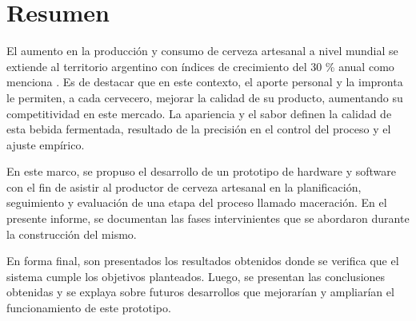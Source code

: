 \pagestyle{plain}
\afterpage{\null\newpage}\thispagestyle{plain}
\newpage
\chapter{Resumen}
\par
    El aumento en la producción y consumo de cerveza artesanal a nivel mundial se extiende al territorio argentino con índices de crecimiento del 30 \% anual como menciona \cite{Cuculiansky17}. Es de destacar que en este contexto, el aporte personal y la impronta le permiten, a cada cervecero, mejorar la calidad de su producto, aumentando su competitividad en este mercado. La apariencia y el sabor definen la calidad de esta bebida fermentada, resultado de la precisión en el control del proceso y el ajuste empírico.
\par
    En este marco, se propuso el desarrollo de un prototipo de hardware y software con el fin de asistir al productor de cerveza artesanal en la planificación, seguimiento y evaluación de una etapa del proceso llamado maceración. En el presente informe, se documentan las fases intervinientes que se abordaron durante la construcción del mismo.
\par
    En forma final, son presentados los resultados obtenidos donde se verifica que el sistema cumple los objetivos planteados. Luego, se presentan las conclusiones obtenidas y se explaya sobre futuros desarrollos que mejorarían y ampliarían el funcionamiento de este prototipo.